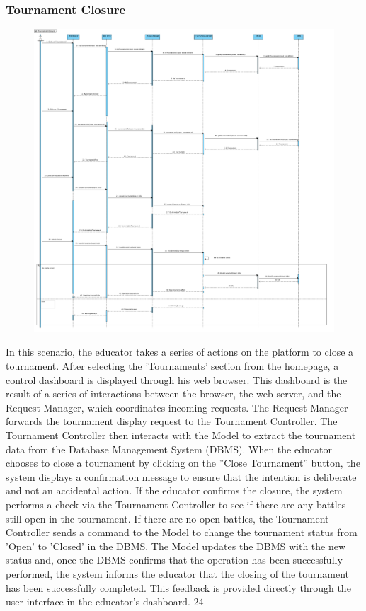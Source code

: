 \subsubsection{Tournament Closure}
\begin{figure}[H]
    \centering
    \includegraphics[width=1\textwidth]{SequenceDiagram/TournamentClosure.png}
    \label{fig:enter-label}
\end{figure}
In this scenario, the educator takes a series of actions on the platform to close a tournament. After
selecting the ’Tournaments’ section from the homepage, a control dashboard is displayed through his
web browser. This dashboard is the result of a series of interactions between the browser, the web server,
and the Request Manager, which coordinates incoming requests. The Request Manager forwards the
tournament display request to the Tournament Controller. The Tournament Controller then interacts
with the Model to extract the tournament data from the Database Management System (DBMS). When
the educator chooses to close a tournament by clicking on the ”Close Tournament” button, the system
displays a confirmation message to ensure that the intention is deliberate and not an accidental action.
If the educator confirms the closure, the system performs a check via the Tournament Controller to see if
there are any battles still open in the tournament. If there are no open battles, the Tournament Controller
sends a command to the Model to change the tournament status from ’Open’ to ’Closed’ in the DBMS.
The Model updates the DBMS with the new status and, once the DBMS confirms that the operation
has been successfully performed, the system informs the educator that the closing of the tournament
has been successfully completed. This feedback is provided directly through the user interface in the
educator’s dashboard.
24


